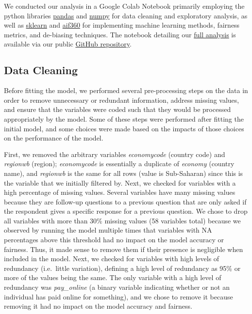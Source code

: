 \documentclass[water,article,submit,moreauthors,pdftex]{mdpi}
\begin{document}
We conducted our analysis in a Google Colab Notebook primarily employing
the python libraries \href{https://pandas.pydata.org/}{pandas} and
\href{https://numpy.org/}{numpy} for data cleaning and exploratory
analysis, as well as \href{https://scikit-learn.org/stable/}{sklearn}
and \href{https://aif360.readthedocs.io/en/latest/}{aif360} for
implementing machine learning methods, fairness metrics, and de-biasing
techniques. The notebook detailing our
\href{https://github.com/sds-capstone/2022-09-proj7-women-at-table/blob/main/final_project.ipynb}{full
analysis} is available via our public
\href{https://github.com/sds-capstone/2022-09-proj7-women-at-table}{GitHub
repository}.

\hypertarget{data-cleaning}{%
\subsection{Data Cleaning}\label{data-cleaning}}

Before fitting the model, we performed several pre-processing steps on
the data in order to remove unnecessary or redundant information,
address missing values, and ensure that the variables were coded such
that they would be processed appropriately by the model. Some of these
steps were performed after fitting the initial model, and some choices
were made based on the impacts of those choices on the performance of
the model.

First, we removed the arbitrary variables \emph{economycode} (country
code) and \emph{regionwb} (region); \emph{economycode} is essentially a
duplicate of \emph{economy} (country name), and \emph{regionwb} is the
same for all rows (value is Sub-Saharan) since this is the variable that
we initially filtered by. Next, we checked for variables with a high
percentage of missing values. Several variables have many missing values
because they are follow-up questions to a previous question that are
only asked if the respondent gives a specific response for a previous
question. We chose to drop all variables with more than 30\% missing
values (58 variables total) because we observed by running the model
multiple times that variables with NA percentages above this threshold
had no impact on the model accuracy or fairness. Thus, it made sense to
remove them if their presence is negligible when included in the model.
Next, we checked for variables with high levels of redundancy
(i.e.~little variation), defining a high level of redundancy as 95\% or
more of the values being the same. The only variable with a high level
of redundancy was \emph{pay\_online} (a binary variable indicating
whether or not an individual has paid online for something), and we
chose to remove it because removing it had no impact on the model
accuracy and fairness.
\end{document}
